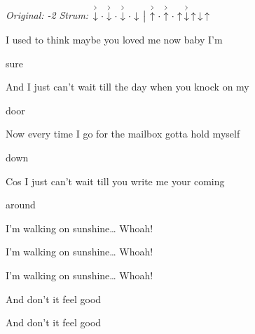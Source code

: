 \begin{song}


\begin{headerbox}
\RaiseBoxWithAccents
\textit{Original: -2} \quad
\textit{Strum:} $\AccentDown\Miss\AccentDown\Miss\AccentDown\Miss\Down \Separator \AccentUp\Miss\AccentUp\Miss\Up\AccentDown\Up\Down\Up$ \quad
\end{headerbox}

\begin{hchordbox}
\end{hchordbox}

\large

\bigskip

I used to think maybe you loved me now baby I'm \par
{}sure    \par
And I just can’t wait till the day when you knock on my \par
{}door    \par
Now every time I go for the mailbox gotta hold myself \par
{}down    \par
Cos I just can’t wait till you write me your coming \par
around    \par

\bigskip

I'm walking on sunshine… Whoah! \par
I'm walking on sunshine… Whoah! \par
I'm walking on sunshine… Whoah! \par
And don't it feel good    \par
And don’t it feel good    \par

\bigskip


\end{song}
